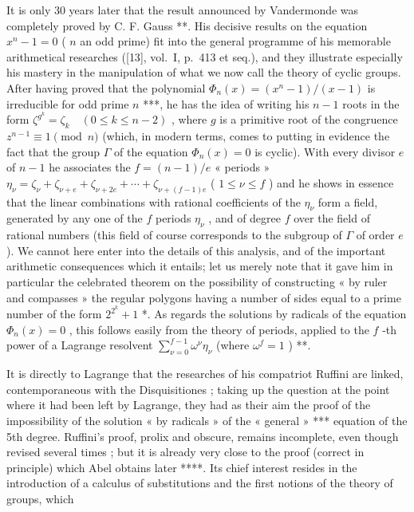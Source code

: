 It is only 30 years later that the result announced by Vandermonde was completely proved by C. F. Gauss **. His decisive results on the equation \(x^n - 1 = 0\) ( \(n\) an odd prime) fit into the general programme of his memorable arithmetical researches ({[}13{]}, vol.~I, p.~413 et seq.), and they illustrate especially his mastery in the manipulation of what we now call the theory of cyclic groups. After having proved that the polynomial \(\Phi_n(x) = (x^n - 1)/(x - 1)\) is irreducible for odd prime \(n\) ***, he has the idea of writing his \(n - 1\) roots in the form \(\zeta^{g^{k}} = \zeta_{k} \quad (0 \leqslant k \leqslant n - 2)\) , where \(g\) is a primitive root of the congruence \(z^{n-1} \equiv 1 \pmod{n}\) (which, in modern terms, comes to putting in evidence the fact that the group \(\Gamma\) of the equation \(\Phi_{n}(x) = 0\) is cyclic). With every divisor \(e\) of \(n - 1\) he associates the \(f = (n - 1)/e\) « periods » \(\eta_{\nu} = \zeta_{\nu} + \zeta_{\nu + e} + \zeta_{\nu + 2e} + \cdots + \zeta_{\nu + (f - 1)e}\) ( \(1 \leqslant \nu \leqslant f\) ) and he shows in essence that the linear combinations with rational coefficients of the \(\eta_{\nu}\) form a field, generated by any one of the \(f\) periods \(\eta_{\nu}\) , and of degree \(f\) over the field of rational numbers (this field of course corresponds to the subgroup of \(\Gamma\) of order \(e\) ). We cannot here enter into the details of this analysis, and of the important arithmetic consequences which it entails; let us merely note that it gave him in particular the celebrated theorem on the possibility of constructing « by ruler and compasses » the regular polygons having a number of sides equal to a prime number of the form \(2^{2^{k}} + 1\) *. As regards the solutions by radicals of the equation \(\Phi_{n}(x) = 0\) , this follows easily from the theory of periods, applied to the \(f\) -th power of a Lagrange resolvent \(\sum_{\nu=0}^{f-1} \omega^{\nu} \eta_{\nu}\) (where \(\omega^{f} = 1\) ) **.

It is directly to Lagrange that the researches of his compatriot Ruffini are linked, contemporaneous with the Disquisitiones ; taking up the question at the point where it had been left by Lagrange, they had as their aim the proof of the impossibility of the solution « by radicals » of the « general » *** equation of the 5th degree. Ruffini's proof, prolix and obscure, remains incomplete, even though revised several times ; but it is already very close to the proof (correct in principle) which Abel obtains later ****. Its chief interest resides in the introduction of a calculus of substitutions and the first notions of the theory of groups, which

